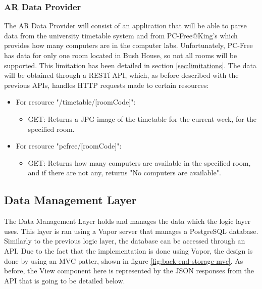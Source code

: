 \subsubsection{AR Data Provider}
The AR Data Provider will consist of an application that will be able to parse data from the university timetable system and from PC-Free@King's which provides how many computers are in the computer labs. Unfortunately, PC-Free has data for only one room located in Bush House, so not all rooms will be supported. This limitation has been detailed in section \ref{sec:limitations}. The data will be obtained through a RESTf API, which, as before described with the previous APIs, handles HTTP requests made to certain resources:
\begin{itemize}
    \item For resource "/timetable/[roomCode]":
    \begin{itemize}
        \item GET: Returns a JPG image of the timetable for the current week, for the specified room.
    \end{itemize}
    
    \item For resource "pcfree/[roomCode]":
    \begin{itemize}
        \item GET: Returns how many computers are available in the specified room, and if there are not any, returns "No computers are available".
    \end{itemize}
\end{itemize}

\subsection{Data Management Layer}
The Data Management Layer holds and manages the data which the logic layer uses. This layer is ran using a Vapor server that manages a PostgreSQL database. Similarly to the previous logic layer, the database can be accessed through an API. Due to the fact that the implementation is done using Vapor, the design is done by using an MVC patter, shown in figure \ref{fig:back-end-storage-mvc}. As before, the View component here is represented by the JSON responses from the API that is going to be detailed below.

